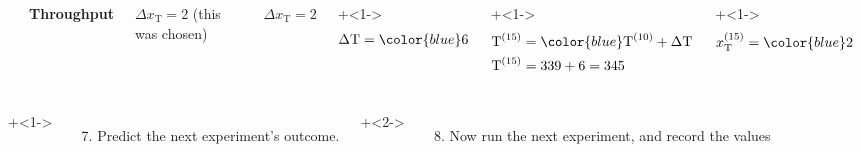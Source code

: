 \begin{frame}
\begin{columns}[T]
			\rule[3mm]{0.01cm}{56.5mm}%
			
			\centerline{\textbf{Throughput}}
			
			$\Delta x_\text{T} = 2$ (this was chosen)
			
			\vspace{1.3cm}
			$\Delta x_\text{T} = 2$ 
		
			\vspace{-0.85cm}
			\onslide+<1->{
				\begin{align*} 
					\Delta \text{T} &= {\color{blue} 6} \\
				\end{align*}
			}
			
			\vspace{-2cm}
			\onslide+<1->{
				\begin{align*} 
					 \text{T}^{(15)} &=  {\color{blue} \text{T}^{(10)} + \Delta \text{T}}\\
					 \text{T}^{(15)} &= 339 + 6 = 345\\
				\end{align*}
			}
			
			\vspace{-1.9cm}
			\onslide+<1->{	
				\begin{align*} 
					x_\text{T}^{(15)} &= {\color{blue} 2} 
				\end{align*}
			}
	\end{columns}
	
	\vspace{-0.5cm}
	\begin{columns}[T]

			\vspace{-0.0cm}
			\onslide+<1->{
				{\tiny 
					\begin{enumerate}\setcounter{enumi}{6}
						\item	Predict the next experiment's outcome.
					\end{enumerate}
				
				\par}
			}
			
			\vspace{0cm}
			\onslide+<2->{
				{\tiny 
					\begin{enumerate}\setcounter{enumi}{7}
						\item	Now run the next experiment, and record the values
					\end{enumerate}
				
				\par}
			}
			

\end{columns}
\end{frame}
